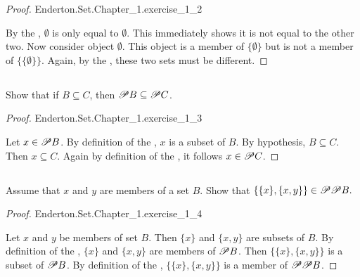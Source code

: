 \documentclass{report}
\begin{document}
\begin{proof}

    {Enderton.Set.Chapter\_1.exercise\_1\_2}

  By the , $\emptyset$ is only equal to
    $\emptyset$.
  This immediately shows it is not equal to the other two.
  Now consider object $\emptyset$.
  This object is a member of $\{\emptyset\}$ but is not a member of
    $\{\{\emptyset\}\}$.
  Again, by the , these two sets must be
    different.

\end{proof}

\subsection{}%
\label{sub:exercise-1.3}

Show that if $B \subseteq C$, then $\mathscr{P}B \subseteq \mathscr{P}C$.

\begin{proof}

    {Enderton.Set.Chapter\_1.exercise\_1\_3}

  Let $x \in \mathscr{P}B$.
  By definition of the , $x$ is a subset of $B$.
  By hypothesis, $B \subseteq C$.
  Then $x \subseteq C$.
  Again by definition of the , it follows
    $x \in \mathscr{P}C$.

\end{proof}

\subsection{}%
\label{sub:exercise-1.4}

Assume that $x$ and $y$ are members of a set $B$.
Show that $\{\{x\}, \{x, y\}\} \in \mathscr{P}\mathscr{P}B.$

\begin{proof}

    {Enderton.Set.Chapter\_1.exercise\_1\_4}

  Let $x$ and $y$ be members of set $B$.
  Then $\{x\}$ and $\{x, y\}$ are subsets of $B$.
  By definition of the , $\{x\}$ and $\{x, y\}$ are
    members of $\mathscr{P}B$.
  Then $\{\{x\}, \{x, y\}\}$ is a subset of $\mathscr{P}B$.
  By definition of the , $\{\{x\}, \{x, y\}\}$ is a
    member of $\mathscr{P}\mathscr{P}B$.

\end{proof}
\end{document}

